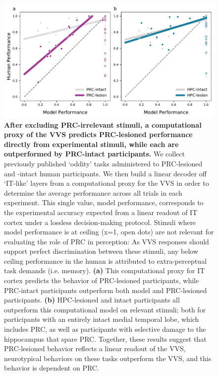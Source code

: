 \documentclass[11pt]{article}
\begin{document}
\begin{figure}[ht]
\centering
\includegraphics[width=\linewidth]{figures/prc_mtl_intact_compact_conv5_1}
\caption{\textbf{After excluding PRC-irrelevant stimuli, a computational proxy of the VVS predicts PRC-lesioned performance directly from experimental stimuli, while each are outperformed by PRC-intact participants.} We collect previously published `oddity' tasks administered to PRC-lesioned and -intact human participants. We then build a linear decoder off `IT-like' layers from a computational proxy for the VVS in order to determine the average performance across all trials in each experiment. This single value, model performance, corresponds to the experimental accuracy expected from a linear readout of IT cortex under a lossless decision-making protocol. Stimuli where model performance is at ceiling (x=1, open dots) are not relevant for evaluating the role of PRC in perception: As VVS responses should support perfect discrimination between these stimuli, any below ceiling performance in the human is attributed to extra-perceptual task demands (i.e. memory). \textbf{(a)} This computational proxy for IT cortex predicts the behavior of PRC-lesioned participants, while PRC-intact participants outperform both model and PRC-lesioned participants. \textbf{(b)} HPC-lesioned and intact participants all outperform this computational model on relevant stimuli; both for participants with an entirely intact medial temporal lobe, which includes PRC, as well as participants with selective damage to the hippocampus that spare PRC. Together, these results suggest that PRC-lesioned behavior reflects a linear readout of the VVS, neurotypical behaviors on these tasks outperform the VVS, and this behavior is dependent on PRC.}
\label{fig:prc_main}
\end{figure}
\end{document}
